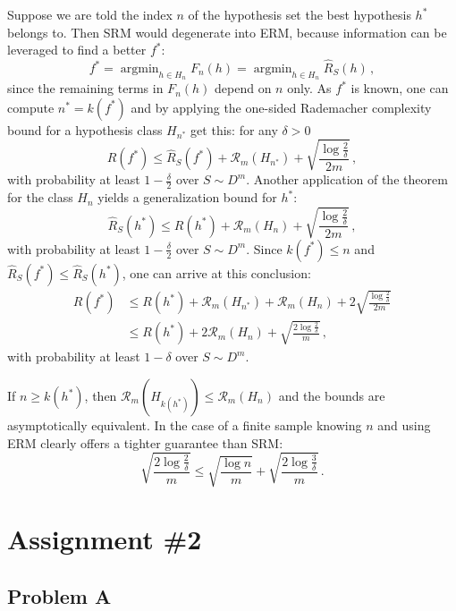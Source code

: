 \documentclass[a4paper]{article}
\newcommand{\argmin}{\mathop{\text{argmin}}}
\begin{document}
Suppose we are told the index $n$ of the hypothesis set the best hypothesis $h^*$
belongs to. Then SRM would degenerate into ERM, because information can be leveraged
to find a better $f^*$:
\[ f^* = \argmin_{h\in H_n} F_n(h) = \argmin_{h\in H_n} \hat{R}_S(h) \,,\]
since the remaining terms in $F_n(h)$ depend on $n$ only. As $f^*$ is known, one
can compute $n^* = k(f^*)$ and by applying the one-sided Rademacher complexity
bound for a hypothesis class $H_{n^*}$ get this: for any $\delta>0$
\[ R(f^*) \leq \hat{R}_S(f^*) + \mathcal{R}_m(H_{n^*})
          + \sqrt{\frac{\log\frac{2}{\delta}}{2m}}
  \,, \]
with probability at least $1-\frac{\delta}{2}$ over $S\sim D^m$. Another application
of the theorem for the class $H_n$ yields a generalization bound for $h^*$:
\[ \hat{R}_S(h^*) \leq R(h^*) + \mathcal{R}_m(H_n)
                  + \sqrt{\frac{\log\frac{2}{\delta}}{2m}}
  \,, \]
with probability at least $1-\frac{\delta}{2}$ over $S\sim D^m$. Since $k(f^*) \leq n$
and $\hat{R}_S(f^*) \leq \hat{R}_S(h^*)$, one can arrive at this conclusion:
\begin{align*}
  R(f^*)
    &\leq R(h^*) + \mathcal{R}_m(H_{n^*}) + \mathcal{R}_m(H_n)
     + 2 \sqrt{\frac{\log\frac{2}{\delta}}{2m}} \\
    &\leq R(h^*) + 2\mathcal{R}_m(H_n)
     + \sqrt{\frac{2\log\frac{2}{\delta}}{m}} \,,
\end{align*}
with probability at least $1-\delta$ over $S\sim D^m$. 

\noindent If $n \geq k(h^*)$, then $\mathcal{R}_m(H_{k(h^*)}) \leq \mathcal{R}_m(H_n)$
and the bounds are asymptotically equivalent. In the case of a finite sample knowing
$n$ and using ERM clearly offers a tighter guarantee than SRM:
\[ \sqrt{\frac{2\log\frac{2}{\delta}}{m}}
    \leq \sqrt{\frac{\log n}{m}}
      + \sqrt{\frac{2\log\frac{3}{\delta}}{m}}
  \,. \]




\section{Assignment \#2} %
\label{sec:assignment_2}

\subsection{Problem A} %
\label{sub:problem_2a}
\end{document}
